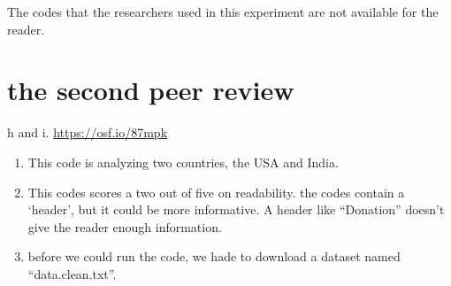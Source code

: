\documentclass[
]{book}
\begin{document}
The codes that the researchers used in this experiment are not available for the reader.

\hypertarget{the-second-peer-review}{%
\section{the second peer review}\label{the-second-peer-review}}

h and i.
\url{https://osf.io/87mpk}

\begin{enumerate}
\def\labelenumi{\alph{enumi}.}
\setcounter{enumi}{9}
\item
  This code is analyzing two countries, the USA and India.
\item
  This codes scores a two out of five on readability. the codes contain a `header', but it could be more informative. A header like ``Donation'' doesn't give the reader enough information.
\item
  before we could run the code, we hade to download a dataset named ``data.clean.txt''.
\end{enumerate}
\end{document}
